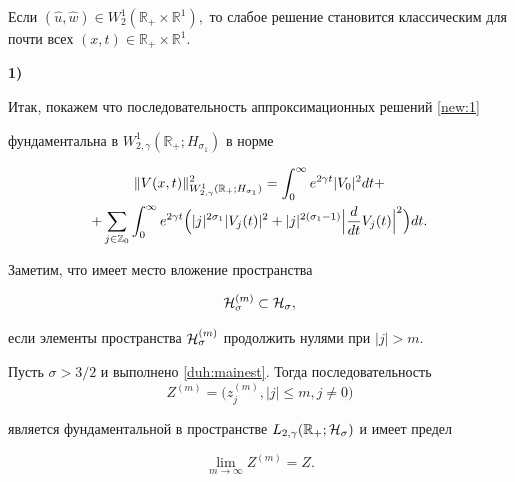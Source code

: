 \newpage



\begin{theorem}[13]Если $(\widehat{u}, \widehat{w})\in W^1_2(\mathbb R_{+}\times \mathbb R^1),$ то слабое решение становится классическим для почти всех $(x,t)\in \mathbb R_{+}\times \mathbb R^1.$

\end{theorem}



\smallskip



\textbf{1)} 

Итак, покажем что последовательность аппроксимационных решений \eqref{new:1}

фундаментальна в $W^1_{2,\gamma}(\mathbb R_{+}; H_{\sigma_1})$ в норме

\begin{multline*}

\|V(x,t)\|^2_{W^1_{2,\gamma}(\mathbb R_{+}; H_{\sigma_1})}=\int_0^\infty e^{2\gamma t} |V_0|^2 dt+

\\

+\sum_{j\in \mathbb Z_0} \int_0^\infty e^{2\gamma t} 

\Bigl(|j|^{2\sigma_1} |V_j(t)|^2 +|j|^{2(\sigma_1-1)} \Bigl|\frac{d}{dt}V_j(t)\Bigr|^2\Bigr) dt.

\end{multline*}

Заметим, что имеет место вложение пространства

\begin{equation}

{\cal H}^{(m)}_{\sigma} \subset {\cal H}_{\sigma},

\label{duh:space}

\end{equation}

если элементы пространства ${\cal H}^{(m)}_{\sigma}$ продолжить нулями при $|j|>m$.



\smallskip



\hypertarget{dukh:th14}{}



\begin{theorem}[14]\label{duh:fundz}Пусть $\sigma>3/2$ и выполнено \eqref{duh:mainest}$.$ Тогда последовательность $$Z^{(m)}=\bigl( z^{(m)}_j, |j|\le m, j\ne 0 \bigr)$$ 

является фундаментальной в пространстве $L_{2,\gamma}(\mathbb R_{+};{\cal H}_{\sigma})$ и имеет предел

$$

\lim_{m\to \infty}Z^{(m)}= Z.

$$

\end{theorem}



